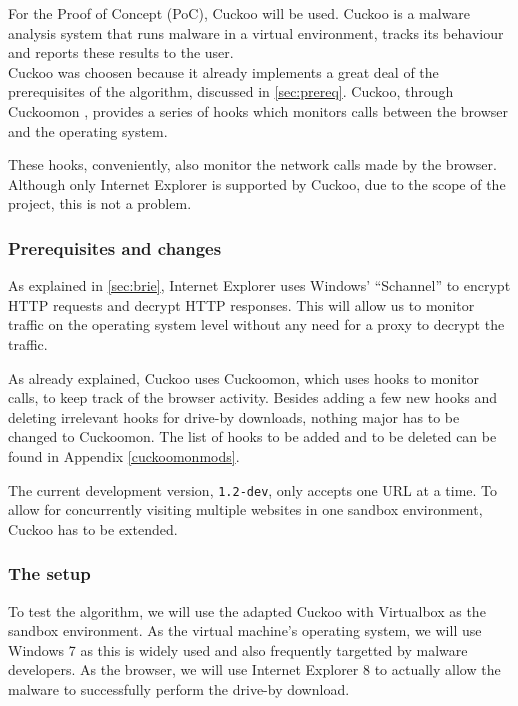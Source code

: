 
For the Proof of Concept (PoC), Cuckoo \cite{cuckoo} will be used. Cuckoo is a malware analysis system that runs malware in a virtual environment, tracks its behaviour and reports these results to the user.\\

Cuckoo was choosen because it already implements a great deal of the prerequisites of the algorithm, discussed in \ref{sec:prereq}. Cuckoo, through Cuckoomon \cite{cuckoomon}, provides a series of hooks which monitors calls between the browser and the operating system.

These hooks, conveniently, also monitor the network calls made by the browser. Although only Internet Explorer is supported by Cuckoo, due to the scope of the project, this is not a problem.

\subsubsection{Prerequisites and changes}

As explained in \ref{sec:brie}, Internet Explorer uses Windows' ``Schannel'' \cite{schannel} to encrypt HTTP requests and decrypt HTTP responses. This will allow us to monitor traffic on the operating system level without any need for a proxy to decrypt the traffic.

As already explained, Cuckoo uses Cuckoomon, which uses hooks to monitor calls, to keep track of the browser activity. Besides adding a few new hooks and deleting irrelevant hooks for drive-by downloads, nothing major has to be changed to Cuckoomon. The list of hooks to be added and to be deleted can be found in Appendix \ref{cuckoomonmods}.

The current development version, \texttt{1.2-dev},  only accepts one URL at a time. To allow for concurrently visiting multiple websites in one sandbox environment, Cuckoo has to be extended.

\subsubsection{The setup}
\label{sec:setup}

To test the algorithm, we will use the adapted Cuckoo with Virtualbox as the sandbox environment. As the virtual machine's operating system, we will use Windows 7 as this is widely used and also frequently targetted by malware developers. As the browser, we will use Internet Explorer 8 to actually allow the malware to successfully perform the drive-by download.

